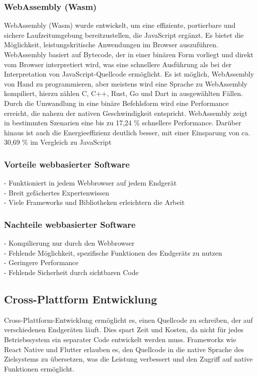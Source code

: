 \subsubsection{WebAssembly (Wasm)}
WebAssembly (Wasm) wurde entwickelt, um eine effiziente, portierbare und sichere Laufzeitumgebung bereitzustellen, die JavaScript ergänzt. Es bietet die Möglichkeit, leistungskritische Anwendungen im Browser auszuführen. WebAssembly basiert auf Bytecode, der in einer binären Form vorliegt und direkt vom Browser interpretiert wird, was eine schnellere Ausführung als bei der Interpretation von JavaScript-Quellcode ermöglicht. Es ist möglich, WebAssembly von Hand zu programmieren, aber meistens wird eine Sprache zu WebAssembly kompiliert, hierzu zählen C, C++, Rust, Go und Dart in ausgewählten Fällen. Durch die Umwandlung in eine binäre Befehlsform wird eine Performance erreicht, die nahezu der nativen Geschwindigkeit entspricht. WebAssembly zeigt in bestimmten Szenarien eine bis zu 17,24 \% schnellere Performance. Darüber hinaus ist auch die Energieeffizienz deutlich besser, mit einer Einsparung von ca. 30,69 \% im Vergleich zu JavaScript 
\cite{WebAssemblyVsJavaScript}

\subsubsection*{Vorteile webbasierter Software}

- Funktioniert in jedem Webbrowser auf jedem Endgerät \\
- Breit gefächertes Expertenwissen \\
- Viele Frameworks und Bibliotheken erleichtern die Arbeit

\subsubsection*{Nachteile webbasierter Software}

- Kompilierung nur durch den Webbrowser \\
- Fehlende Möglichkeit, spezifische Funktionen des Endgeräts zu nutzen \\
- Geringere Performance \\
- Fehlende Sicherheit durch sichtbaren Code

\subsection{Cross-Plattform Entwicklung}

Cross-Plattform-Entwicklung ermöglicht es, einen Quellcode zu schreiben, der auf verschiedenen Endgeräten läuft. Dies spart Zeit und Kosten, da nicht für jedes Betriebssystem ein separater Code entwickelt werden muss. Frameworks wie React Native und Flutter erlauben es, den Quellcode in die native Sprache des Zielsystems zu übersetzen, was die Leistung verbessert und den Zugriff auf native Funktionen ermöglicht.

